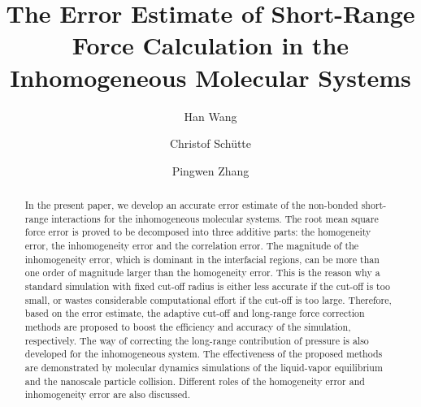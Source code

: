 \documentclass[aps, pre, preprint]{revtex4}
\begin{document}
\title{The Error Estimate of Short-Range Force Calculation in the Inhomogeneous Molecular Systems}
\author{Han Wang}
\author{Christof Sch\"utte}
\author{Pingwen Zhang}

\begin{abstract}
  {
    In the present paper, we develop an accurate error estimate of the
    non-bonded short-range interactions for the inhomogeneous molecular
    systems.
    The root mean square force error is proved to be decomposed into
    three additive parts: the homogeneity error, the inhomogeneity error
    and the correlation error.
    The magnitude of the inhomogeneity error, which
    is dominant in the interfacial regions, 
    can be more than one order of magnitude larger than the homogeneity
    error.
    This is the reason why a standard simulation with fixed
    cut-off radius is either less accurate if the cut-off is too small,
    or wastes considerable computational effort if the cut-off is too large.
    Therefore, based on the error estimate, the adaptive cut-off
    and long-range force correction methods are proposed to
    boost the efficiency and accuracy of the simulation, respectively.
    The way of correcting the long-range contribution of pressure
    is also developed for the inhomogeneous system.
    The
    effectiveness of the proposed methods are demonstrated by
    molecular dynamics 
    simulations of the liquid-vapor equilibrium and the nanoscale particle
    collision. Different roles of the homogeneity error and inhomogeneity
    error are also discussed.
  }
\end{abstract}

\maketitle
\end{document}

